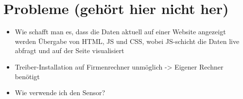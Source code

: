 \section{Probleme (gehört hier nicht her)}
\begin{itemize}
	\item Wie schafft man es, dass die Daten aktuell auf einer Website angezeigt werden
	\subitem Übergabe von HTML, JS und CSS, wobei JS-schicht die Daten live abfragt und auf der Seite visualisiert
    \item Treiber-Installation auf Firmenrechner unmöglich -> Eigener Rechner benötigt
    \item Wie verwende ich den Sensor?
\end{itemize}